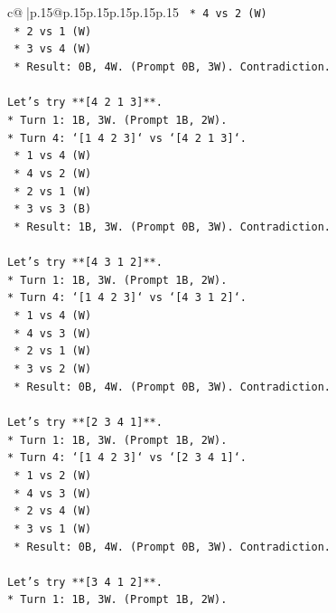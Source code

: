 \documentclass{article}
\begin{document}
{\begin{supertabular}{c@{$\;$}|p{.15\linewidth}@{}p{.15\linewidth}p{.15\linewidth}p{.15\linewidth}p{.15\linewidth}p{.15\linewidth}}
{{{\texttt{    *   4 vs 2 (W)} \\
\texttt{    *   2 vs 1 (W)} \\
\texttt{    *   3 vs 4 (W)} \\
\texttt{    *   Result: 0B, 4W. (Prompt 0B, 3W). Contradiction.} \\
\\ 
\texttt{Let's try **{[}4 2 1 3{]}**.} \\
\texttt{*   Turn 1: 1B, 3W. (Prompt 1B, 2W).} \\
\texttt{*   Turn 4: `{[}1 4 2 3{]}` vs `{[}4 2 1 3{]}`.} \\
\texttt{    *   1 vs 4 (W)} \\
\texttt{    *   4 vs 2 (W)} \\
\texttt{    *   2 vs 1 (W)} \\
\texttt{    *   3 vs 3 (B)} \\
\texttt{    *   Result: 1B, 3W. (Prompt 0B, 3W). Contradiction.} \\
\\ 
\texttt{Let's try **{[}4 3 1 2{]}**.} \\
\texttt{*   Turn 1: 1B, 3W. (Prompt 1B, 2W).} \\
\texttt{*   Turn 4: `{[}1 4 2 3{]}` vs `{[}4 3 1 2{]}`.} \\
\texttt{    *   1 vs 4 (W)} \\
\texttt{    *   4 vs 3 (W)} \\
\texttt{    *   2 vs 1 (W)} \\
\texttt{    *   3 vs 2 (W)} \\
\texttt{    *   Result: 0B, 4W. (Prompt 0B, 3W). Contradiction.} \\
\\ 
\texttt{Let's try **{[}2 3 4 1{]}**.} \\
\texttt{*   Turn 1: 1B, 3W. (Prompt 1B, 2W).} \\
\texttt{*   Turn 4: `{[}1 4 2 3{]}` vs `{[}2 3 4 1{]}`.} \\
\texttt{    *   1 vs 2 (W)} \\
\texttt{    *   4 vs 3 (W)} \\
\texttt{    *   2 vs 4 (W)} \\
\texttt{    *   3 vs 1 (W)} \\
\texttt{    *   Result: 0B, 4W. (Prompt 0B, 3W). Contradiction.} \\
\\ 
\texttt{Let's try **{[}3 4 1 2{]}**.} \\
\texttt{*   Turn 1: 1B, 3W. (Prompt 1B, 2W).} \\
}}}
\end{supertabular}}
\end{document}
